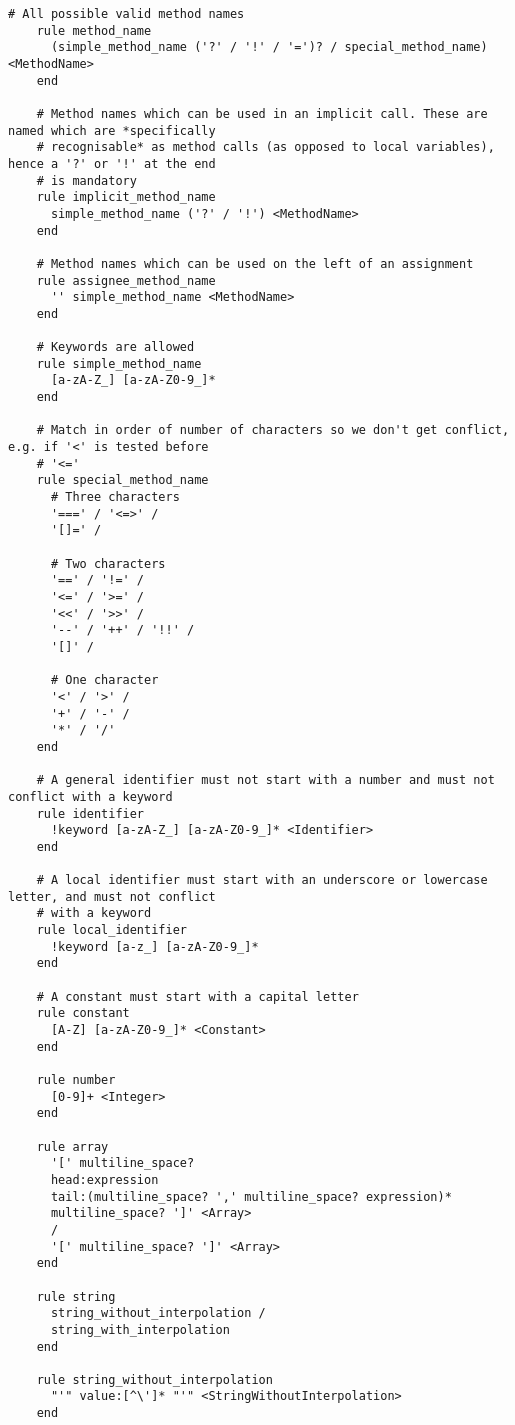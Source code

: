 \begin{lstlisting}[title={\small\Helvetica parser/language.treetop},language=treetop]
    # All possible valid method names
    rule method_name
      (simple_method_name ('?' / '!' / '=')? / special_method_name) <MethodName>
    end
    
    # Method names which can be used in an implicit call. These are named which are *specifically
    # recognisable* as method calls (as opposed to local variables), hence a '?' or '!' at the end
    # is mandatory
    rule implicit_method_name
      simple_method_name ('?' / '!') <MethodName>
    end
    
    # Method names which can be used on the left of an assignment
    rule assignee_method_name
      '' simple_method_name <MethodName>
    end
    
    # Keywords are allowed
    rule simple_method_name
      [a-zA-Z_] [a-zA-Z0-9_]*
    end
    
    # Match in order of number of characters so we don't get conflict, e.g. if '<' is tested before
    # '<='
    rule special_method_name
      # Three characters
      '===' / '<=>' /
      '[]=' /
      
      # Two characters
      '==' / '!=' /
      '<=' / '>=' /
      '<<' / '>>' /
      '--' / '++' / '!!' /
      '[]' /
      
      # One character
      '<' / '>' /
      '+' / '-' /
      '*' / '/'
    end
    
    # A general identifier must not start with a number and must not conflict with a keyword
    rule identifier
      !keyword [a-zA-Z_] [a-zA-Z0-9_]* <Identifier>
    end
    
    # A local identifier must start with an underscore or lowercase letter, and must not conflict
    # with a keyword
    rule local_identifier
      !keyword [a-z_] [a-zA-Z0-9_]*
    end
    
    # A constant must start with a capital letter
    rule constant
      [A-Z] [a-zA-Z0-9_]* <Constant>
    end
    
    rule number
      [0-9]+ <Integer>
    end
    
    rule array
      '[' multiline_space?
      head:expression
      tail:(multiline_space? ',' multiline_space? expression)*
      multiline_space? ']' <Array>
      /
      '[' multiline_space? ']' <Array>
    end
    
    rule string
      string_without_interpolation /
      string_with_interpolation
    end
    
    rule string_without_interpolation
      "'" value:[^\']* "'" <StringWithoutInterpolation>
    end
    

\end{lstlisting}

